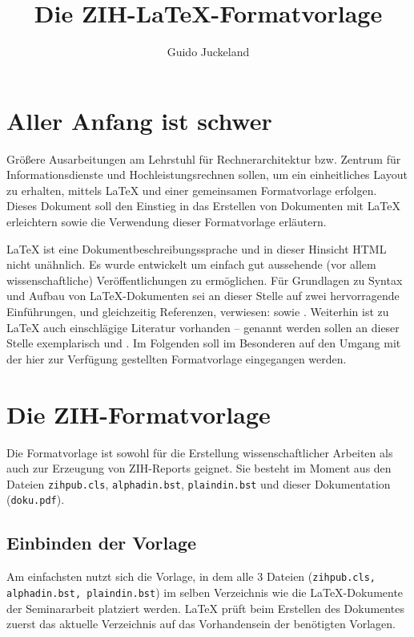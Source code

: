 \documentclass[plainarticle,zihtitle,german,final,hyperref,utf8]{zihpub}
\author{Guido Juckeland}
\title{Die ZIH-\LaTeX-Formatvorlage}
\begin{document}
\section{Aller Anfang ist schwer}
Grö{\ss}ere Ausarbeitungen am Lehrstuhl für Rechnerarchitektur bzw. Zentrum für Informationsdienste und Hochleistungsrechnen sollen, um ein einheitliches Layout zu erhalten, mittels {\LaTeX} und einer gemeinsamen Formatvorlage erfolgen. 
Dieses Dokument soll den Einstieg in das Erstellen von Dokumenten mit {\LaTeX} erleichtern sowie die Verwendung dieser Formatvorlage erläutern.

{\LaTeX} ist eine Dokumentbeschreibungssprache und in dieser Hinsicht HTML nicht unähnlich. 
Es wurde entwickelt um einfach gut aussehende (vor allem wissenschaftliche) Veröffentlichungen zu ermöglichen. 
Für Grundlagen zu Syntax und Aufbau von {\LaTeX}-Dokumenten sei an dieser Stelle auf zwei hervorragende Einführungen, und gleichzeitig Referenzen, verwiesen: \cite{kochbuch} sowie \cite{rudl}. 
Weiterhin ist zu {\LaTeX} auch einschlägige Literatur vorhanden -- genannt werden sollen an dieser Stelle exemplarisch \cite{begleiter} und \cite{kopka}. 
Im Folgenden soll im Besonderen auf den Umgang mit der hier zur Verfügung gestellten Formatvorlage eingegangen werden.

\section{Die ZIH-Formatvorlage}
Die Formatvorlage ist sowohl für die Erstellung wissenschaftlicher Arbeiten als auch zur Erzeugung von ZIH-Reports geignet. 
Sie besteht im Moment aus den Dateien \texttt{zihpub.cls}, \texttt{alphadin.bst}, \texttt{plaindin.bst} und dieser Dokumentation (\texttt{doku.pdf}).


\subsection{Einbinden der Vorlage}
Am einfachsten nutzt sich die Vorlage, in dem alle 3 Dateien (\texttt{zihpub.cls, alphadin.bst, plaindin.bst}) im selben Verzeichnis wie die {\LaTeX}-Dokumente der Seminararbeit platziert werden. 
{\LaTeX} prüft beim Erstellen des Dokumentes zuerst das aktuelle Verzeichnis auf das Vorhandensein der benötigten Vorlagen.
\end{document}
